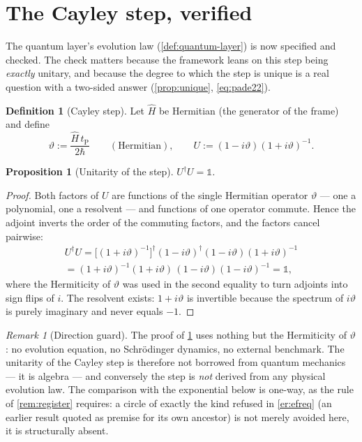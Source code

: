 \documentclass[11pt]{amsbook}
\theoremstyle{plain}
\newtheorem{proposition}[theorem]{Proposition}
\theoremstyle{definition}
\newtheorem{definition}[theorem]{Definition}
\theoremstyle{remark}
\newtheorem{remark}[theorem]{Remark}
\newcommand{\uses}[1]{\par\nopagebreak\noindent{\footnotesize\emph{Uses: #1.}\par}}
\begin{document}
\section{The Cayley step, verified}\label{sec:cayley-audit}

The quantum layer's evolution law (\cref{def:quantum-layer}) is now specified and checked. The check matters because the framework leans on this step being \emph{exactly} unitary, and because the degree to which the step is unique is a real question with a two-sided answer (\cref{prop:unique}, \cref{eq:pade22}).

\begin{definition}[Cayley step]\label{def:cayley}
Let $\hat H$ be Hermitian (the generator of the frame) and define
\begin{equation}\label{eq:cayleyparam}
\vartheta := \frac{\hat H\, t_{\mathrm P}}{2\hbar} \qquad (\text{Hermitian}),
\qquad
U := (1 - i\vartheta)(1 + i\vartheta)^{-1}.
\end{equation}
\end{definition}

\begin{proposition}[Unitarity of the step]\label{prop:unitarity}
$U^{\dagger} U = \mathbb{1}$.
\uses{\cref{eq:cayleyparam} (Hermiticity of $\vartheta$ only)}
\end{proposition}

\begin{proof}
Both factors of $U$ are functions of the single Hermitian operator $\vartheta$ --- one a polynomial, one a resolvent --- and functions of one operator commute. Hence the adjoint inverts the order of the commuting factors, and the factors cancel pairwise:
\begin{equation}\label{eq:unitarity}
\begin{gathered}
U^{\dagger}U = \bigl[(1 + i\vartheta)^{-1}\bigr]^{\dagger}(1 - i\vartheta)^{\dagger}(1 - i\vartheta)(1 + i\vartheta)^{-1}\\
= (1 + i\vartheta)^{-1}(1 + i\vartheta)\,(1 - i\vartheta)(1 - i\vartheta)^{-1} = \mathbb{1},
\end{gathered}
\end{equation}
where the Hermiticity of $\vartheta$ was used in the second equality to turn adjoints into sign flips of $i$. The resolvent exists: $1 + i\vartheta$ is invertible because the spectrum of $i\vartheta$ is purely imaginary and never equals $-1$.
\end{proof}

\begin{remark}[Direction guard]\label{rem:direction-guard}
The proof of \cref{prop:unitarity} uses nothing but the Hermiticity of $\vartheta$: no evolution equation, no Schr\"odinger dynamics, no external benchmark. The unitarity of the Cayley step is therefore not borrowed from quantum mechanics --- it is algebra --- and conversely the step is \emph{not} derived from any physical evolution law. The comparison with the exponential below is one-way, as the rule of \cref{rem:register} requires: a circle of exactly the kind refused in \cref{er:efreq} (an earlier result quoted as premise for its own ancestor) is not merely avoided here, it is structurally absent.
\end{remark}
\end{document}
